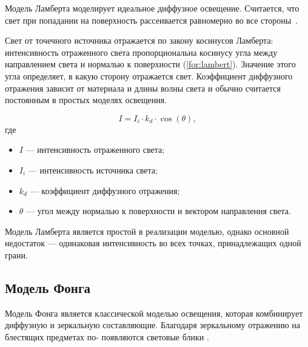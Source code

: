 Модель Ламберта моделирует идеальное диффузное освещение. Считается, что свет при попадании на поверхность рассеивается равномерно во все стороны~\cite{roders}.

Свет от точечного источника отражается по закону косинусов Ламберта: интенсивность отраженного света пропорциональна косинусу угла между направлением света и нормалью к поверхности (\ref{for:lambert}). Значение этого угла определяет, в какую сторону отражается свет. Коэффициент диффузного отражения зависит от материала и длины волны света и обычно считается постоянным в простых моделях освещения.

\begin{equation}
	\label{for:lambert}
	I = I_i \cdot k_d \cdot \cos(\theta),
\end{equation}
где
\begin{itemize}
	\item $I$ --- интенсивность отраженного света;
	\item $I_i$ --- интенсивность источника света;
	\item $k_d$ --- коэффициент диффузного отражения;
	\item $\theta$ --- угол между нормалью к поверхности и вектором направления света.
\end{itemize}

Модель Ламберта является простой в реализации моделью, однако основной недостаток --- одинаковая интенсивность во всех точках, принадлежащих одной грани.


\subsection{Модель Фонга}

Модель Фонга является классической моделью освещения, которая комбинирует диффузную и зеркальную составляющие. Благодаря зеркальному отражению на блестящих предметах по-
появляются световые блики \cite{roders}.

